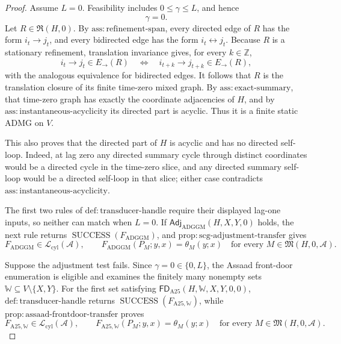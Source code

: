 \documentclass{article}
\begin{document}
\begin{proof}
Assume \(L=0\).  Feasibility includes \(0\leq\gamma\leq L\), and hence
\[
\gamma=0.
\]
Let \(R\in\mathfrak R(H,0)\).  By \(\mathrm{ass:refinement\text{-}span}\), every directed edge of \(R\) has the form \(i_t\to j_t\), and every bidirected edge has the form \(i_t\leftrightarrow j_t\).  Because \(R\) is a stationary refinement, translation invariance gives, for every \(k\in\mathbb Z\),
\[
i_t\to j_t\in E_{\to}(R)
\quad\Longleftrightarrow\quad
i_{t+k}\to j_{t+k}\in E_{\to}(R),
\]
with the analogous equivalence for bidirected edges.  It follows that \(R\) is the translation closure of its finite time-zero mixed graph.  By \(\mathrm{ass:exact\text{-}summary}\), that time-zero graph has exactly the coordinate adjacencies of \(H\), and by \(\mathrm{ass:instantaneous\text{-}acyclicity}\) its directed part is acyclic.  Thus it is a finite static ADMG on \(V\).

This also proves that the directed part of \(H\) is acyclic and has no directed self-loop.  Indeed, at lag zero any directed summary cycle through distinct coordinates would be a directed cycle in the time-zero slice, and any directed summary self-loop would be a directed self-loop in that slice; either case contradicts \(\mathrm{ass:instantaneous\text{-}acyclicity}\).

The first two rules of \(\mathrm{def:transducer\text{-}handle}\) require their displayed lag-one inputs, so neither can match when \(L=0\).  If \(\mathsf{Adj}_{\mathrm{ADGGM}}(H,X,Y,0)\) holds, the next rule returns \(\operatorname{SUCCESS}(F_{\mathrm{ADGGM}})\), and \(\mathrm{prop:scg\text{-}adjustment\text{-}transfer}\) gives
\[
F_{\mathrm{ADGGM}}\in\mathcal L_{\mathrm{cyl}}(\mathcal A),
\qquad
F_{\mathrm{ADGGM}}(P_M;y,x)=\theta_M(y;x)
\quad
\text{for every }M\in\mathfrak M(H,0,\mathcal A).
\]

Suppose the adjustment test fails.  Since \(\gamma=0\in\{0,L\}\), the Assaad front-door enumeration is eligible and examines the finitely many nonempty sets \(\mathbb W\subseteq V\setminus\{X,Y\}\).  For the first set satisfying \(\mathsf{FD}_{\mathrm{A25}}(H,\mathbb W,X,Y,0,0)\), \(\mathrm{def:transducer\text{-}handle}\) returns \(\operatorname{SUCCESS}(F_{\mathrm{A25},\mathbb W})\), while \(\mathrm{prop:assaad\text{-}frontdoor\text{-}transfer}\) proves
\[
F_{\mathrm{A25},\mathbb W}\in\mathcal L_{\mathrm{cyl}}(\mathcal A),
\qquad
F_{\mathrm{A25},\mathbb W}(P_M;y,x)=\theta_M(y;x)
\quad
\text{for every }M\in\mathfrak M(H,0,\mathcal A).
\]


\end{proof}
\end{document}
